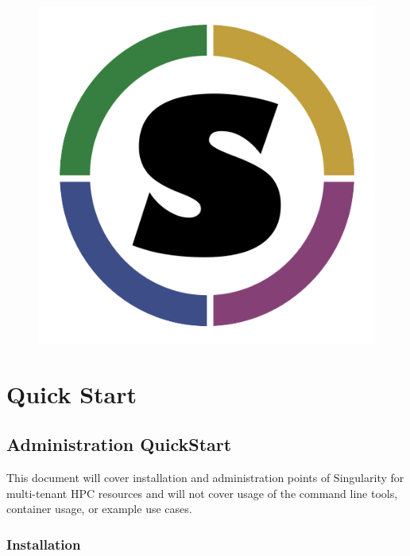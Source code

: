\documentclass[a4paper]{article}
\date{\vspace{-5ex}}
\begin{document}
\lstset{language=bash}          %
\lstset{basicstyle = \ttfamily,columns=fullflexible}

\begin{figure}
\centering
{\includegraphics[scale=0.25]{logo.png}}
\end{figure}

\justify


\section{Quick Start}
\label{sec:quickstart}
 
\subsection{Administration QuickStart}
This document will cover installation and administration points of Singularity for multi-tenant HPC resources and will not cover usage of the command line tools, container usage, or example use cases.

\newpage


\tableofcontents
\newpage


\subsubsection{Installation}
\end{document}
